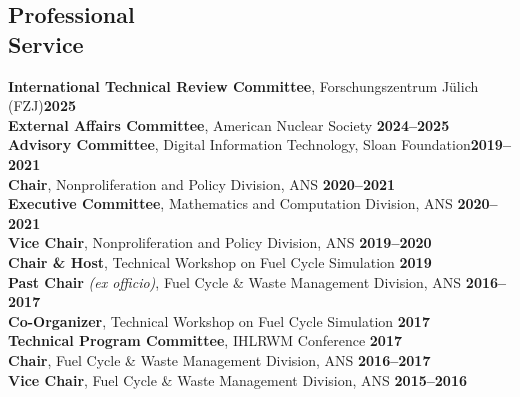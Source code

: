 \documentclass[margin,line]{resume}
\begin{document}
\begin{resume}
  \section{\mysidestyle Professional\\Service}
    \textbf{International Technical Review Committee}, Forschungszentrum Jülich 
    (FZJ)\hfill\textbf{2025}\vspace{.5mm}\\%
    \textbf{External Affairs Committee}, American Nuclear Society \hfill\textbf{2024--2025}\vspace{.5mm}\\%
    \textbf{Advisory Committee}, Digital Information Technology, Sloan Foundation\hfill\textbf{2019--2021}\vspace{.5mm}\\%
                \textbf{Chair}, Nonproliferation and Policy Division, ANS  \hfill \textbf{2020--2021}\vspace{.5mm}\\%
                \textbf{Executive Committee}, Mathematics and Computation Division, ANS  \hfill \textbf{2020--2021}\vspace{.5mm}\\%
                \textbf{Vice Chair}, Nonproliferation and Policy Division, ANS  \hfill \textbf{2019--2020}\vspace{.5mm}\\%
                \textbf{Chair \& Host}, Technical Workshop on Fuel Cycle Simulation \hfill \textbf{2019}\vspace{.5mm}\\%
    \textbf{Past Chair} \emph{(ex officio)}, Fuel Cycle \& Waste Management Division, ANS  \hfill \textbf{2016--2017}\vspace{.5mm}\\%
                \textbf{Co-Organizer}, Technical Workshop on Fuel Cycle Simulation \hfill \textbf{2017}\vspace{.5mm}\\%
                \textbf{Technical Program Committee}, IHLRWM Conference \hfill \textbf{2017}\vspace{.5mm}\\%
                \textbf{Chair}, Fuel Cycle \& Waste Management Division, ANS  \hfill \textbf{2016--2017}\vspace{.5mm}\\%
                \textbf{Vice Chair}, Fuel Cycle \& Waste Management Division, ANS  \hfill \textbf{2015--2016}\vspace{.5mm}\\%

\end{resume}
\end{document}
